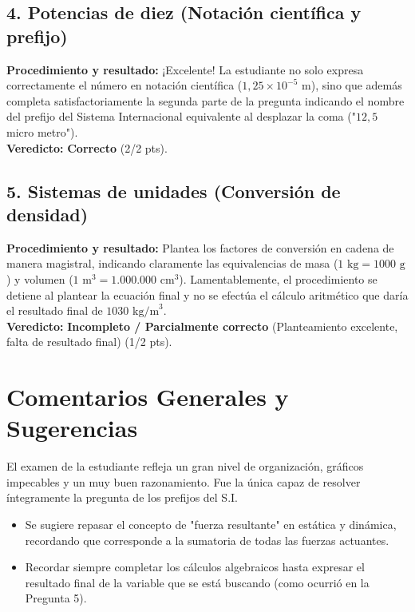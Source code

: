 \documentclass[12pt]{article}
\begin{document}
\subsection*{4. Potencias de diez (Notación científica y prefijo)}
\textbf{Procedimiento y resultado:} ¡Excelente! La estudiante no solo expresa correctamente el número en notación científica ($1,25 \times 10^{-5}$ m), sino que además completa satisfactoriamente la segunda parte de la pregunta indicando el nombre del prefijo del Sistema Internacional equivalente al desplazar la coma ("$12,5$ micro metro"). \\
\textbf{Veredicto:} \textbf{Correcto} (2/2 pts).

\subsection*{5. Sistemas de unidades (Conversión de densidad)}
\textbf{Procedimiento y resultado:} Plantea los factores de conversión en cadena de manera magistral, indicando claramente las equivalencias de masa ($1 \text{ kg} = 1000 \text{ g}$) y volumen ($1 \text{ m}^3 = 1.000.000 \text{ cm}^3$). Lamentablemente, el procedimiento se detiene al plantear la ecuación final y no se efectúa el cálculo aritmético que daría el resultado final de $1030 \text{ kg/m}^3$. \\
\textbf{Veredicto:} \textbf{Incompleto / Parcialmente correcto} (Planteamiento excelente, falta de resultado final) (1/2 pts).

\vspace{0.5cm}
\section*{Comentarios Generales y Sugerencias}
El examen de la estudiante refleja un gran nivel de organización, gráficos impecables y un muy buen razonamiento. Fue la única capaz de resolver íntegramente la pregunta de los prefijos del S.I. 
\begin{itemize}
    \item Se sugiere repasar el concepto de "fuerza resultante" en estática y dinámica, recordando que corresponde a la sumatoria de todas las fuerzas actuantes.
    \item Recordar siempre completar los cálculos algebraicos hasta expresar el resultado final de la variable que se está buscando (como ocurrió en la Pregunta 5).
\end{itemize}
\end{document}
